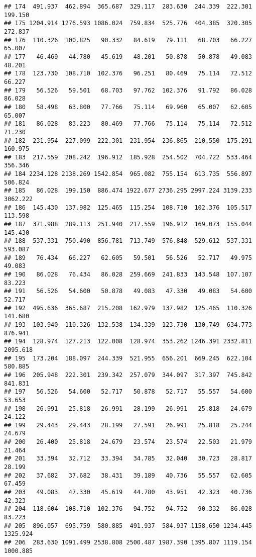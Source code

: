 \documentclass[
]{article}
\begin{document}
\begin{verbatim}
## 174  491.937  462.894  365.687  329.117  283.630  244.339  222.301  199.150
## 175 1204.914 1276.593 1086.024  759.834  525.776  404.385  320.305  272.837
## 176  110.326  100.825   90.332   84.619   79.111   68.703   66.227   65.007
## 177   46.469   44.780   45.619   48.201   50.878   50.878   49.083   48.201
## 178  123.730  108.710  102.376   96.251   80.469   75.114   72.512   66.227
## 179   56.526   59.501   68.703   97.762  102.376   91.792   86.028   86.028
## 180   58.498   63.800   77.766   75.114   69.960   65.007   62.605   65.007
## 181   86.028   83.223   80.469   77.766   75.114   75.114   72.512   71.230
## 182  231.954  227.099  222.301  231.954  236.865  210.550  175.291  160.975
## 183  217.559  208.242  196.912  185.928  254.502  704.722  533.464  356.346
## 184 2234.128 2138.269 1542.854  965.082  755.154  613.735  556.897  506.824
## 185   86.028  199.150  886.474 1922.677 2736.295 2997.224 3139.233 3062.222
## 186  145.430  137.982  125.465  115.254  108.710  102.376  105.517  113.598
## 187  371.988  289.113  251.940  217.559  196.912  169.073  155.044  145.430
## 188  537.331  750.490  856.781  713.749  576.848  529.612  537.331  593.087
## 189   76.434   66.227   62.605   59.501   56.526   52.717   49.975   49.083
## 190   86.028   76.434   86.028  259.669  241.833  143.548  107.107   83.223
## 191   56.526   54.600   50.878   49.083   47.330   49.083   54.600   52.717
## 192  495.636  365.687  215.208  162.979  137.982  125.465  110.326  141.680
## 193  103.940  110.326  132.538  134.339  123.730  130.749  634.773  876.941
## 194  128.974  127.213  122.008  128.974  353.262 1246.391 2332.811 2095.618
## 195  173.204  188.097  244.339  521.955  656.201  669.245  622.104  580.885
## 196  205.948  222.301  239.342  257.079  344.097  317.397  745.842  841.831
## 197   56.526   54.600   52.717   50.878   52.717   55.557   54.600   53.653
## 198   26.991   25.818   26.991   28.199   26.991   25.818   24.679   24.122
## 199   29.443   29.443   28.199   27.591   26.991   25.818   25.244   24.679
## 200   26.400   25.818   24.679   23.574   23.574   22.503   21.979   21.464
## 201   33.394   32.712   33.394   34.785   32.040   30.723   28.817   28.199
## 202   37.682   37.682   38.431   39.189   40.736   55.557   62.605   67.459
## 203   49.083   47.330   45.619   44.780   43.951   42.323   40.736   42.323
## 204  118.604  108.710  102.376   94.752   94.752   90.332   86.028   83.223
## 205  896.057  695.759  580.885  491.937  584.937 1158.650 1234.445 1325.924
## 206  283.630 1091.499 2538.808 2500.487 1987.390 1395.807 1119.154 1000.885

\end{verbatim}
\end{document}
